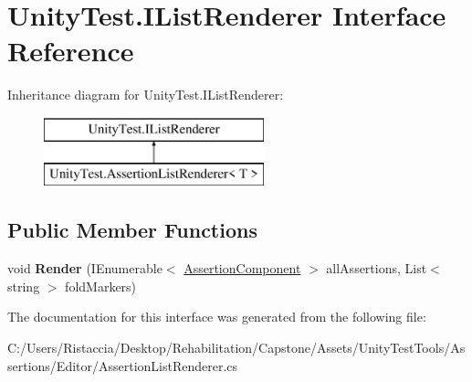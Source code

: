 \hypertarget{interface_unity_test_1_1_i_list_renderer}{}\section{Unity\+Test.\+I\+List\+Renderer Interface Reference}
\label{interface_unity_test_1_1_i_list_renderer}
Inheritance diagram for Unity\+Test.\+I\+List\+Renderer\+:\begin{figure}[H]
\begin{center}
\leavevmode
\includegraphics[height=2.000000cm]{interface_unity_test_1_1_i_list_renderer}
\end{center}
\end{figure}
\subsection*{Public Member Functions}
\begin{DoxyCompactItemize}
\item 
\mbox{\label{interface_unity_test_1_1_i_list_renderer_a0379153fa1f815791100150340bab9e9}} 
void {\bfseries Render} (I\+Enumerable$<$ \hyperlink{class_unity_test_1_1_assertion_component}{Assertion\+Component} $>$ all\+Assertions, List$<$ string $>$ fold\+Markers)
\end{DoxyCompactItemize}


The documentation for this interface was generated from the following file\+:\begin{DoxyCompactItemize}
\item 
C\+:/\+Users/\+Ristaccia/\+Desktop/\+Rehabilitation/\+Capstone/\+Assets/\+Unity\+Test\+Tools/\+Assertions/\+Editor/Assertion\+List\+Renderer.\+cs\end{DoxyCompactItemize}
